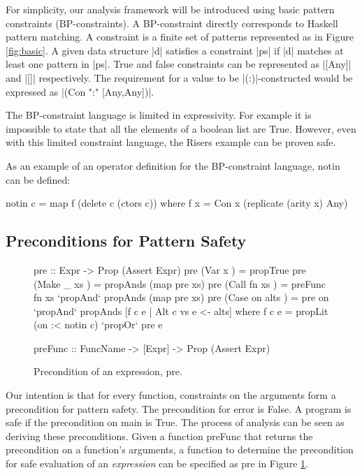 \documentclass[preprint]{sigplanconf}
\newcommand{\C}[1]{\textsf{#1}}
\begin{document}
For simplicity, our analysis framework will be introduced using basic pattern constraints (BP-constraints). A BP-constraint directly corresponds to Haskell pattern matching. A constraint is a finite set of patterns represented as in Figure \ref{fig:basic}. A given data structure |d| satisfies a constraint |ps| if |d| matches at least one pattern in |ps|. True and false constraints can be represented as |[Any]| and |[]| respectively. The requirement for a value to be |(:)|-constructed would be expressed as |(Con ":" [Any,Any])|.

The BP-constraint language is limited in expressivity. For example it is impossible to state that all the elements of a boolean list are True. However, even with this limited constraint language, the Risers example can be proven safe.

As an example of an operator definition for the BP-constraint language, \C{notin} can be defined:

\begin{code}
notin c = map f (delete c (ctors c))
   where f x = Con x (replicate (arity x) Any)
\end{code}


\subsection{Preconditions for Pattern Safety}
\label{sec:precond}

\begin{figure}
\begin{code}
pre :: Expr -> Prop (Assert Expr)
pre (Var   x         ) = propTrue
pre (Make  _   xs    ) = propAnds (map pre xs)
pre (Call  fn  xs    ) = preFunc fn xs `propAnd` propAnds (map pre xs)
pre (Case  on  alts  ) = pre on `propAnd` propAnds [f c e | Alt c vs e <- alts]
    where f c e = propLit (on :< notin c) `propOr` pre e

preFunc :: FuncName -> [Expr] -> Prop (Assert Expr)
\end{code}
\caption{Precondition of an expression, \C{pre}.}
\label{fig:precondition}
\end{figure}

Our intention is that for every function, constraints on the arguments form a precondition for pattern safety. The precondition for \C{error} is False. A program is safe if the precondition on \C{main} is True. The process of analysis can be seen as deriving these preconditions. Given a function \C{preFunc} that returns the precondition on a function's arguments, a function to determine the precondition for safe evaluation of an \textit{expression} can be specified as \C{pre} in Figure \ref{fig:precondition}.
\end{document}
